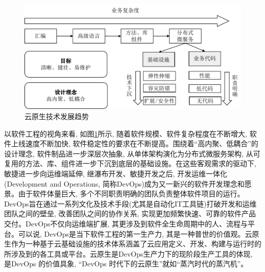 \begin{figure}[h] %
    \centering %
    \includegraphics[width=0.9 \textwidth]{FIGs/chapter2/cloud_native_development.pdf} %
    \caption{云原生技术发展趋势} %
    \label{cloud_native_development} %
\end{figure}%

以软件工程的视角来看, 如图\ref{cloud_native_development}所示, 随着软件规模、软件复杂程度在不断增大, 软件上线速度不断加快, 软件稳定性的要求在不断提高。围绕着“高内聚、低耦合”的设计理念, 软件制品进一步深层次抽象, 从单体架构演化为分布式微服务架构, 从可复用的方法、库、组件进一步下沉到底层的基础设施。在这些客观需求的驱动下, 敏捷进一步向运维端延伸, 继瀑布开发、敏捷开发之后, 开发运维一体化(Development and Operations, 简称DevOps)成为又一新兴的软件开发理念和愿景。由于软件体量巨大, 多个不同职责明确的团队负责整体软件项目的运行。DevOps旨在通过一系列文化及技术手段(尤其是自动化IT工具链)打破开发和运维团队之间的壁垒, 改善团队之间的协作关系, 实现更加频繁快速、可靠的软件产品交付\cite{ChinaDevops}。DevOps不仅向运维端扩展, 其更涉及到软件全生命周期中的人、流程与平台。可以说, DevOps是当下软件工程的第一生产力, 其是一种普世的价值观。云原生作为一种基于云基础设施的技术体系涵盖了云应用定义、开发、构建与运行时的所涉及到的各工具或平台。云原生是DevOps生产力下的现阶段生产工具的体现, 是DevOps 的价值具象, “DevOps 时代下的云原生”就如“蒸汽时代的蒸汽机”。

